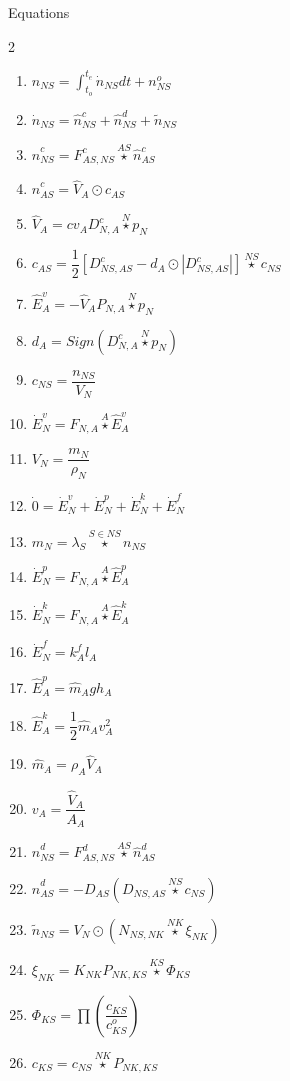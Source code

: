 \documentclass[10pt,a4paper]{report}
\begin{document}
	\newpage
	\Large{Equations}
	\begin{multicols}{2}
	\begin{enumerate}
		\item $n_{NS} = \int_{t_o}^{t_e} \dot{n}_{NS} dt + n^{o}_{NS}$
		\item $\dot{n}_{NS} = \hat{n}^{c}_{NS} + \hat{n}^{d}_{NS} + \tilde{n}_{NS}$
		\item $\hat{n}^{c}_{NS} = F^{c}_{AS,NS} \overset{AS}{\star} \hat{n}^{c}_{AS}$
		\item $\hat{n}^{c}_{AS} = \hat{V}_{A} \odot c_{AS}$
		\item $\hat{V}_{A} = cv_A D^{c}_{N,A} \overset{N}{\star} p_N$
		\item $c_{AS} = \dfrac{1}{2} \left[ D^{c}_{NS,AS} - d_A \odot \left|D^{c}_{NS,AS} \right|  \right] \overset{NS}{\star} c_{NS}$
		\item $\hat{E}^{v}_{A} = -\hat{V}_{A} P_{N,A} \overset{N}{\star} p_N$
		\item $d_A = Sign(D^{c}_{N,A} \overset{N}{\star} p_N)$
		\item $c_{NS} = \dfrac{n_{NS}}{V_N}$
		\item $\dot{E}^{v}_N = F_{N,A} \overset{A}{\star} \hat{E}^{v}_{A}$
		\item $V_N = \dfrac{m_N}{\rho_N}$
		\item $\dot{0} = \dot{E}^{v}_N + \dot{E}^{p}_N + \dot{E}^{k}_N + \dot{E}^{f}_N$
		\item $m_N = \lambda_S \overset{S \in NS}{\star} n_{NS}$
		\item $\dot{E}^{p}_N = F_{N,A} \overset{A}{\star} \hat{E}^{p}_{A}$
		\item $\dot{E}^{k}_N = F_{N,A} \overset{A}{\star} \hat{E}^{k}_{A}$
		\item $\dot{E}^{f}_N = k^{f}_A l_A$
		\item $\hat{E}^{p}_{A} = \hat{m}_A g h_A$
		\item $\hat{E}^{k}_{A} = \dfrac{1}{2} \hat{m}_A v_A^2$
		\item $\hat{m}_A = \rho_A \hat{V}_{A}$
		\item $v_A = \dfrac{\hat{V}_{A}}{A_A} $
		\item $\hat{n}^{d}_{NS} = F^{d}_{AS,NS} \overset{AS}{\star} \hat{n}^{d}_{AS}$
		\item $\hat{n}^{d}_{AS} = -D_{AS} \left( D_{NS,AS} \overset{NS}{\star} c_{NS} \right) $
		\item $\tilde{n}_{NS} = V_N \odot \left( N_{NS, NK} \overset{NK}{\star} \xi_{NK} \right) $	 
		\item $\xi_{NK} = K_{NK} P_{NK, KS} \overset{KS}{\star} \Phi_{KS}$
		\item $\Phi_{KS} = \prod \left( \dfrac{c_{KS}}{c^{o}_{KS}} \right) $
		\item $c_{KS} = c_{NS} \overset{NK}{\star} P_{NK, KS}$
		
	\end{enumerate}
\end{multicols}	
\end{document}
